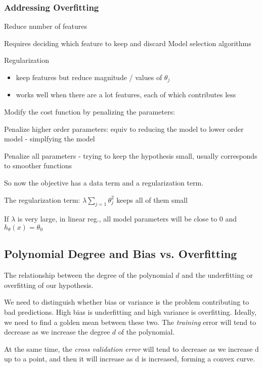 \subsubsection{Addressing Overfitting}

Reduce number of features

Requires deciding which feature to keep and discard
Model selection algorithms

Regularization

\begin{itemize}
\item keep features but reduce magnitude / values of $\theta_j$ 
\item works well when there are a lot features, each of which contributes less
\end{itemize}

Modify the cost function by penalizing the parameters:

Penalize higher order parameters: equiv to reducing the model to lower order model - simplfying the model

Penalize all parameters  - trying to keep the hypothesis small, usually corresponds to smoother functions

So now the objective has a data term and a regularization term.

The regularization term: $\lambda\sum_{j=1} \theta_j^2 $ keeps all of them small

If $\lambda $ is very large, in linear reg., all model parameters will be close to 0 and $h_\theta(x) = \theta_0$ 

\subsection{Polynomial Degree and Bias vs. Overfitting}

The relationship between the degree of the polynomial $d$ and the underfitting or overfitting of our hypothesis.

We need to distinguish whether bias or variance is the problem contributing to bad predictions. 
High bias is underfitting and high variance is overfitting. Ideally, we need to find a golden mean between these two.
The \emph{training} error will tend to decrease as we increase the degree $d$ of the polynomial.

At the same time, the \emph{cross validation error} will tend to decrease as we increase d up to a point, and then it will increase as d is increased, forming a convex curve.

